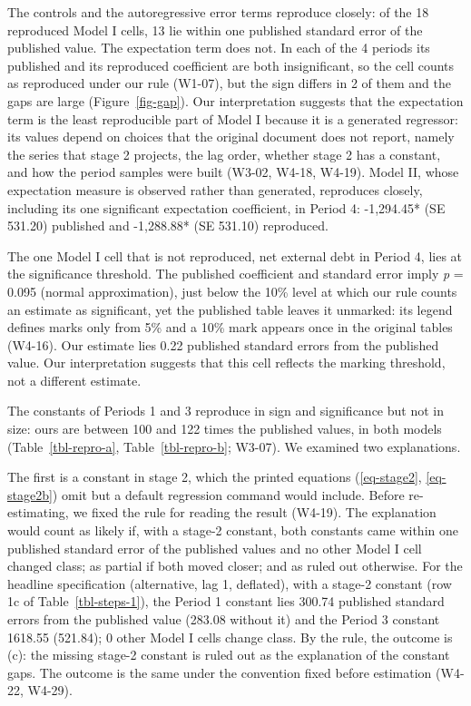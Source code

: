 \documentclass[
  12pt,
  a4paper,
]{article}
\begin{document}
The controls and the autoregressive error terms reproduce closely: of
the 18 reproduced Model I cells, 13 lie within one published standard
error of the published value. The expectation term does not. In each of
the 4 periods its published and its reproduced coefficient are both
insignificant, so the cell counts as reproduced under our rule (W1-07),
but the sign differs in 2 of them and the gaps are large
(Figure~\ref{fig-gap}). Our interpretation suggests that the expectation
term is the least reproducible part of Model I because it is a generated
regressor: its values depend on choices that the original document does
not report, namely the series that stage 2 projects, the lag order,
whether stage 2 has a constant, and how the period samples were built
(W3-02, W4-18, W4-19). Model II, whose expectation measure is observed
rather than generated, reproduces closely, including its one significant
expectation coefficient, in Period 4: -1,294.45* (SE 531.20) published
and -1,288.88* (SE 531.10) reproduced.

The one Model I cell that is not reproduced, net external debt in Period
4, lies at the significance threshold. The published coefficient and
standard error imply \emph{p} = 0.095 (normal approximation), just below
the 10\% level at which our rule counts an estimate as significant, yet
the published table leaves it unmarked: its legend defines marks only
from 5\% and a 10\% mark appears once in the original tables (W4-16).
Our estimate lies 0.22 published standard errors from the published
value. Our interpretation suggests that this cell reflects the marking
threshold, not a different estimate.

The constants of Periods 1 and 3 reproduce in sign and significance but
not in size: ours are between 100 and 122 times the published values, in
both models (Table~\ref{tbl-repro-a}, Table~\ref{tbl-repro-b}; W3-07).
We examined two explanations.

The first is a constant in stage 2, which the printed equations
(\ref{eq-stage2}, \ref{eq-stage2b}) omit but a default regression
command would include. Before re-estimating, we fixed the rule for
reading the result (W4-19). The explanation would count as likely if,
with a stage-2 constant, both constants came within one published
standard error of the published values and no other Model I cell changed
class; as partial if both moved closer; and as ruled out otherwise. For
the headline specification (alternative, lag 1, deflated), with a
stage-2 constant (row 1c of Table~\ref{tbl-steps-1}), the Period 1
constant lies 300.74 published standard errors from the published value
(283.08 without it) and the Period 3 constant 1618.55 (521.84); 0 other
Model I cells change class. By the rule, the outcome is (c): the missing
stage-2 constant is ruled out as the explanation of the constant gaps.
The outcome is the same under the convention fixed before estimation
(W4-22, W4-29).
\end{document}
